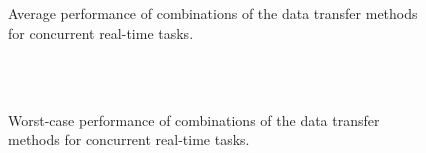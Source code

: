 \begin{figure}[!t]
 \begin{center}
  \\
  \\
  \caption{Average performance of combinations of the data transfer
  methods for concurrent real-time tasks.}
  \label{fig:average_realtime_concurrent}
 \end{center}
\end{figure}
\begin{figure}
 \begin{center}
  \\
  \\
  \caption{Worst-case performance of combinations of the data transfer
  methods for concurrent real-time tasks.}
  \label{fig:worst_realtime_concurrent}
 \end{center}
\end{figure}

